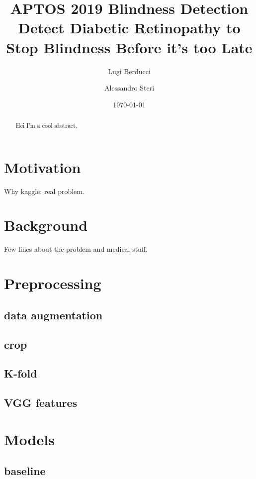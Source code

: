 \documentclass[12pt]{article}
\title{APTOS 2019 Blindness Detection\\ \large Detect Diabetic Retinopathy to Stop Blindness Before it's too Late}
\author{Lugi Berducci \and Alessandro Steri}
\date{\today}
\begin{document}
\maketitle	


\begin{abstract}
Hei I'm a cool abstract.
\end{abstract}

\tableofcontents

\pagebreak

\section{Motivation}
Why kaggle: real problem.
\section{Background}
Few lines about the problem and medical stuff.

\section{Preprocessing}
\subsection{data augmentation}
\subsection{crop}
\subsection{K-fold}
\subsection{VGG features}




\section{Models}
\subsection{baseline}
\end{document}
